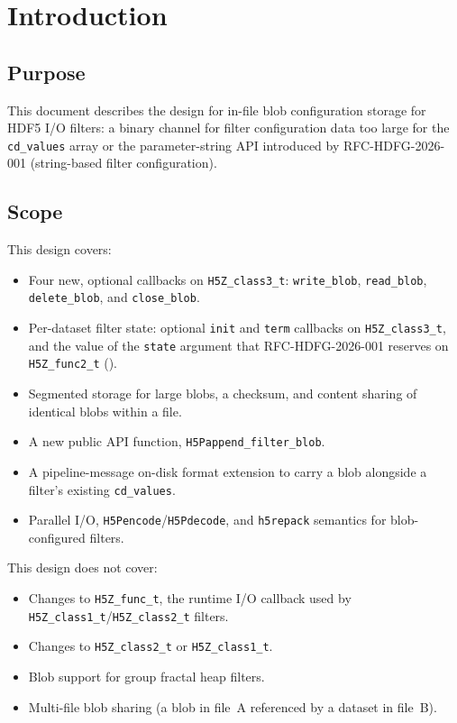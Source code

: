 \documentclass[../RFC-HDFG-2026-003.tex]{subfiles}
\begin{document}
\section{Introduction}
\label{sec:intro}

\subsection{Purpose}

This document describes the design for in-file blob configuration
storage for HDF5 I/O filters: a binary channel for filter configuration
data too large for the \texttt{cd\_values} array or the parameter-string
API introduced by RFC-HDFG-2026-001 (string-based filter configuration).

\subsection{Scope}

This design covers:

\begin{itemize}
\item Four new, optional callbacks on \texttt{H5Z\_class3\_t}:
  \texttt{write\_blob}, \texttt{read\_blob}, \texttt{delete\_blob}, and
  \texttt{close\_blob}.
\item Per-dataset filter state: optional \texttt{init} and \texttt{term}
  callbacks on \texttt{H5Z\_class3\_t}, and the value of the
  \texttt{state} argument that RFC-HDFG-2026-001 reserves on
  \texttt{H5Z\_func2\_t} ().
\item Segmented storage for large blobs, a checksum, and content sharing
  of identical blobs within a file.
\item A new public API function, \texttt{H5Pappend\_filter\_blob}.
\item A pipeline-message on-disk format extension to carry a blob
  alongside a filter's existing \texttt{cd\_values}.
\item Parallel I/O, \texttt{H5Pencode}/\texttt{H5Pdecode}, and
  \texttt{h5repack} semantics for blob-configured filters.
\end{itemize}

This design does not cover:

\begin{itemize}
\item Changes to \texttt{H5Z\_func\_t}, the runtime I/O callback used by
  \texttt{H5Z\_class1\_t}/\texttt{H5Z\_class2\_t} filters.
\item Changes to \texttt{H5Z\_class2\_t} or \texttt{H5Z\_class1\_t}.
\item Blob support for group fractal heap filters.
\item Multi-file blob sharing (a blob in file~A referenced by a dataset
  in file~B).
\end{itemize}
\end{document}
